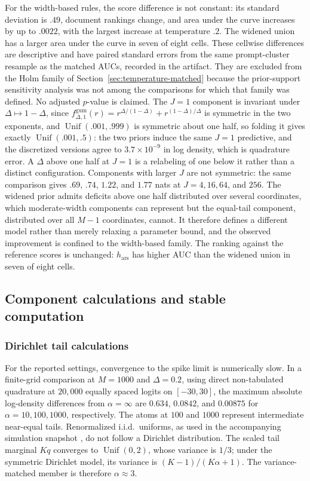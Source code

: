 \documentclass[11pt]{article}
\newcommand{\Unif}{\operatorname{Unif}}
\begin{document}
For the width-based rules, the score difference is not constant: its standard
deviation is $.49$, document rankings change, and area under the curve increases
by up to $.0022$, with the largest increase at temperature $.2$.  The widened
union has a larger area under the curve in seven of eight cells.  These cellwise
differences are descriptive and have paired standard errors from the same
prompt-cluster resample as the matched AUCs, recorded in the artifact.  They are
excluded from the Holm family of Section~\ref{sec:temperature-matched} because the
prior-support sensitivity analysis was not among the comparisons for which that
family was defined.  No adjusted $p$-value is claimed.  The $J=1$ component is
invariant under $\Delta\mapsto1-\Delta$, since
$f^{\mathrm{gum}}_{\Delta,1}(r)=r^{\Delta/(1-\Delta)}+r^{(1-\Delta)/\Delta}$ is
symmetric in the two exponents, and $\Unif(.001,.999)$ is symmetric about one
half, so folding it gives exactly $\Unif(.001,.5)$: the two priors induce the
same $J=1$ predictive, and the discretized versions agree to $3.7\times10^{-9}$
in log density, which is quadrature error.  A $\Delta$ above one half at $J=1$
is a relabeling of one below it rather than a distinct configuration.  Components
with larger $J$ are not symmetric: the same comparison gives $.69$, $.74$, $1.22$,
and $1.77$ nats at $J=4,16,64$, and $256$.  The widened prior admits deficits above
one half distributed over several coordinates, which moderate-width components
can represent but the equal-tail component, distributed over all $M-1$
coordinates, cannot.  It therefore defines a different model rather than merely
relaxing a parameter bound, and the observed improvement is confined to the
width-based family.  The ranking against the reference scores is unchanged:
$h_{\mathrm{ars}}$ has higher AUC than the widened union in seven of eight cells.

\subsection{Component calculations and stable computation}
\label{sec:stable-computation}

\subsubsection{Dirichlet tail calculations}
\label{sec:dirichlet-details}

For the reported settings, convergence to the spike limit is numerically slow.  In a finite-grid comparison at $M=1000$ and $\Delta=0.2$, using direct non-tabulated quadrature at $20{,}000$ equally spaced logits on $[-30,30]$, the maximum absolute log-density differences from $\alpha=\infty$ are $0.634$, $0.0842$, and $0.00875$ for $\alpha=10,100,1000$, respectively.  The atoms at $100$ and $1000$ represent intermediate near-equal tails.  Renormalized i.i.d.\ uniforms, as used in the accompanying simulation snapshot \citep{li2024watermarkframework}, do not follow a Dirichlet distribution.  The scaled tail marginal $Kq$ converges to $\Unif(0,2)$, whose variance is $1/3$; under the symmetric Dirichlet model, its variance is $(K-1)/(K\alpha+1)$.  The variance-matched member is therefore $\alpha\approx3$.
\end{document}
